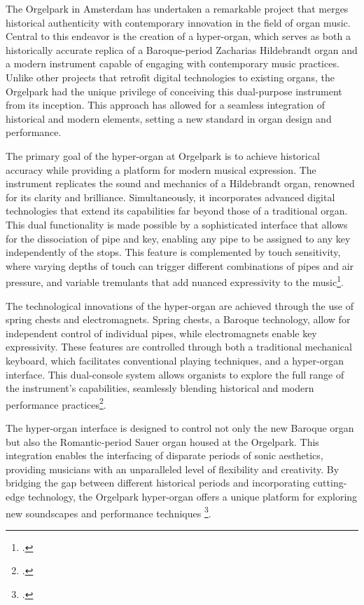 \documentclass[12pt,twoside,maitrise]{dms_ks}
\theoremstyle{definition}
\begin{document}
{{The Orgelpark in Amsterdam has undertaken a remarkable project that merges historical authenticity with contemporary innovation in the field of organ music. 
Central to this endeavor is the creation of a hyper-organ, which serves as both a historically accurate replica of a Baroque-period Zacharias Hildebrandt organ and a modern instrument capable of engaging with contemporary music practices. 
Unlike other projects that retrofit digital technologies to existing organs, the Orgelpark had the unique privilege of conceiving this dual-purpose instrument from its inception. 
This approach has allowed for a seamless integration of historical and modern elements, setting a new standard in organ design and performance.

The primary goal of the hyper-organ at Orgelpark is to achieve historical accuracy while providing a platform for modern musical expression. 
The instrument replicates the sound and mechanics of a Hildebrandt organ, renowned for its clarity and brilliance. 
Simultaneously, it incorporates advanced digital technologies that extend its capabilities far beyond those of a traditional organ. 
This dual functionality is made possible by a sophisticated interface that allows for the dissociation of pipe and key, enabling any pipe to be assigned to any key independently of the stops. 
This feature is complemented by touch sensitivity, where varying depths of touch can trigger different combinations of pipes and air pressure, and variable tremulants that add nuanced expressivity to the music\footcite{fidom_digital_2014}.

The technological innovations of the hyper-organ are achieved through the use of spring chests and electromagnets. 
Spring chests, a Baroque technology, allow for independent control of individual pipes, while electromagnets enable key expressivity. 
These features are controlled through both a traditional mechanical keyboard, which facilitates conventional playing techniques, and a hyper-organ interface. 
This dual-console system allows organists to explore the full range of the instrument's capabilities, seamlessly blending historical and modern performance practices\footcite{peters_how_2014}.

The hyper-organ interface is designed to control not only the new Baroque organ but also the Romantic-period Sauer organ housed at the Orgelpark. 
This integration enables the interfacing of disparate periods of sonic aesthetics, providing musicians with an unparalleled level of flexibility and creativity. By bridging the gap between different historical periods and incorporating cutting-edge technology, the Orgelpark hyper-organ offers a unique platform for exploring new soundscapes and performance techniques \footcite{van_heumen_new_2014}.

}}
\end{document}
